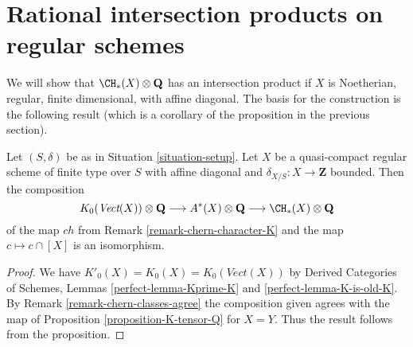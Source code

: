 \section{Rational intersection products on regular schemes}
\label{section-intersection-regular}

\noindent
We will show that $\CH_*(X) \otimes \mathbf{Q}$ has an intersection
product if $X$ is Noetherian, regular, finite dimensional, with
affine diagonal. The basis for the construction is the following result
(which is a corollary of the proposition in the previous section).

\begin{lemma}
\label{lemma-K-tensor-Q}
Let $(S, \delta)$ be as in Situation \ref{situation-setup}.
Let $X$ be a quasi-compact regular scheme of finite type over $S$ with
affine diagonal and $\delta_{X/S} : X \to \mathbf{Z}$ bounded.
Then the composition
$$
K_0(\textit{Vect}(X)) \otimes \mathbf{Q}
\longrightarrow
A^*(X) \otimes \mathbf{Q}
\longrightarrow
\CH_*(X) \otimes \mathbf{Q}
$$
of the map $ch$ from Remark \ref{remark-chern-character-K} and
the map $c \mapsto c \cap [X]$ is an isomorphism.
\end{lemma}

\begin{proof}
We have $K'_0(X) = K_0(X) = K_0(\textit{Vect}(X))$ by
Derived Categories of Schemes, Lemmas \ref{perfect-lemma-Kprime-K} and
\ref{perfect-lemma-K-is-old-K}.
By Remark \ref{remark-chern-classes-agree}
the composition given agrees with the map of
Proposition \ref{proposition-K-tensor-Q} for $X = Y$.
Thus the result follows from the proposition.
\end{proof}


